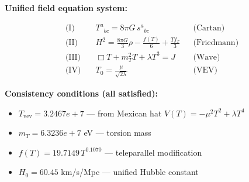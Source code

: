 
\textbf{Unified field equation system:}

\begin{align}
  \text{(I)} \quad & T^a{}_{bc} = 8\pi G \, s^a{}_{bc} && \text{(Cartan)} \\
  \text{(II)} \quad & H^2 = \frac{8\pi G}{3}\rho - \frac{f(T)}{6} + \frac{Tf_T}{3} && \text{(Friedmann)} \\
  \text{(III)} \quad & \Box T + m_T^2 T + \lambda T^3 = J && \text{(Wave)} \\
  \text{(IV)} \quad & T_0 = \frac{\mu}{\sqrt{2\lambda}} && \text{(VEV)}
\end{align}

\textbf{Consistency conditions (all satisfied):}
\begin{itemize}
  \item $T_{\text{vev}} = 3.2467e+7$ — from Mexican hat $V(T) = -\mu^2 T^2 + \lambda T^4$
  \item $m_T = 6.3236e+7$ eV — torsion mass
  \item $f(T) = 19.7149 \, T^{0.1070}$ — teleparallel modification
  \item $H_0 = 60.45$ km/s/Mpc — unified Hubble constant
\end{itemize}